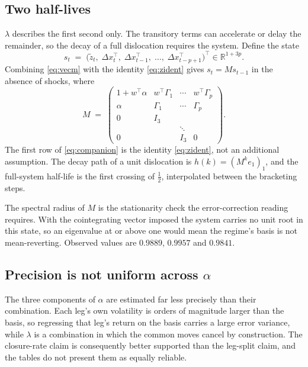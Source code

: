 \documentclass[11pt,a4paper]{article}
\begin{document}
\subsection{Two half-lives}

$\lambda$ describes the first second only. The transitory terms can accelerate or delay the
remainder, so the decay of a full dislocation requires the system. Define the state
\[
s_t \;=\; \bigl(\tilde z_t,\; \Delta x_t^{\top},\; \Delta x_{t-1}^{\top},\;\dots,\;
\Delta x_{t-p+1}^{\top}\bigr)^{\top} \in \mathbb{R}^{1+3p}.
\]
Combining \eqref{eq:vecm} with the identity \eqref{eq:zident} gives $s_t = M s_{t-1}$ in the
absence of shocks, where
\begin{equation}
M \;=\;
\begin{pmatrix}
1 + w^{\top}\alpha & w^{\top}\Gamma_1 & \cdots & w^{\top}\Gamma_p \\[2pt]
\alpha & \Gamma_1 & \cdots & \Gamma_p \\[2pt]
0 & I_3 & & \\
& & \ddots & \\
0 & & I_3 & 0
\end{pmatrix}.
\label{eq:companion}
\end{equation}
The first row of \eqref{eq:companion} is the identity \eqref{eq:zident}, not an additional
assumption. The decay path of a unit dislocation is $h(k) = (M^k e_1)_1$, and the
full-system half-life is the first crossing of $\tfrac12$, interpolated between the
bracketing steps.

The spectral radius of $M$ is the stationarity check the error-correction reading requires.
With the cointegrating vector imposed the system carries no unit root in this state, so an
eigenvalue at or above one would mean the regime's basis is not mean-reverting. Observed
values are $0.9889$, $0.9957$ and $0.9841$.

\subsection{Precision is not uniform across $\alpha$}

The three components of $\alpha$ are estimated far less precisely than their combination.
Each leg's own volatility is orders of magnitude larger than the basis, so regressing that
leg's return on the basis carries a large error variance, while $\lambda$ is a combination
in which the common moves cancel by construction. The closure-rate claim is consequently
better supported than the leg-split claim, and the tables do not present them as equally
reliable.
\end{document}

